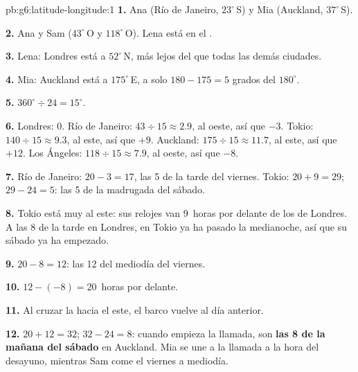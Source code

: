\begin{solution}{pb:g6:latitude-longitude:1}
\textbf{1.} Ana (Río de Janeiro, $23^\circ$\,S) y Mia (Auckland,
$37^\circ$\,S).

\textbf{2.} Ana y Sam ($43^\circ$\,O y $118^\circ$\,O). Lena está en el
.

\textbf{3.} Lena: Londres está a $52^\circ$\,N, más lejos del  que
todas las demás ciudades.

\textbf{4.} Mia: Auckland está a $175^\circ$\,E, a solo $180 - 175 = 5$
grados del  $180^\circ$.

\textbf{5.} $360^\circ \div 24 = 15^\circ$.

\textbf{6.} Londres: $0$. Río de Janeiro: $43 \div 15 \approx 2.9$, al
oeste, así que $-3$. Tokio: $140 \div 15 \approx 9.3$, al este, así que
$+9$. Auckland: $175 \div 15 \approx 11.7$, al este, así que $+12$. Los
Ángeles: $118 \div 15 \approx 7.9$, al oeste, así que $-8$.

\textbf{7.} Río de Janeiro: $20 - 3 = 17$, las 5 de la tarde del viernes.
Tokio: $20 + 9 = 29$; $29 - 24 = 5$: las 5 de la madrugada del sábado.

\textbf{8.} Tokio está muy al este: sus relojes van 9~horas por delante de
los de Londres. A las 8 de la tarde en Londres, en Tokio ya ha pasado la
medianoche, así que su sábado ya ha empezado.

\textbf{9.} $20 - 8 = 12$: las 12 del mediodía del viernes.

\textbf{10.} $12 - (-8) = 20$~horas por delante.

\textbf{11.} Al cruzar la  hacia el este, el barco
vuelve al día anterior.

\textbf{12.} $20 + 12 = 32$; $32 - 24 = 8$: cuando empieza la llamada, son
\textbf{las 8 de la mañana del sábado} en Auckland. Mia se une a la llamada
a la hora del desayuno, mientras Sam come el viernes a mediodía.
\end{solution}
